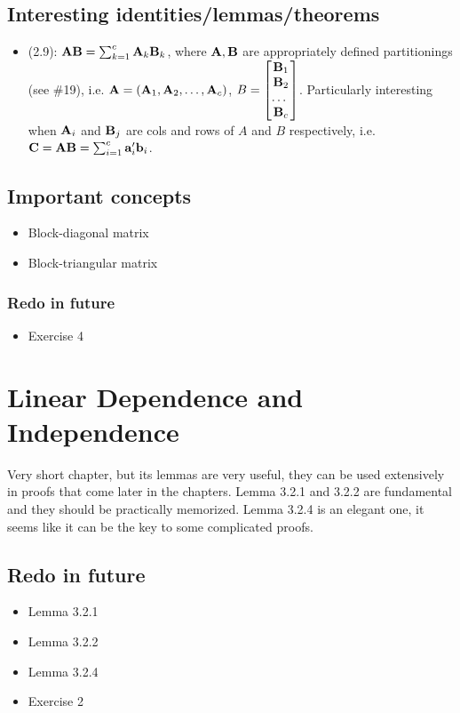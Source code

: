 \documentclass[a4paper, oneside]{book}
\begin{document}
\section*{Interesting identities/lemmas/theorems}
\begin{itemize}
\item (2.9): $\mathbf{AB} = \sum_{k=1}^c \mathbf{A}_k \mathbf{B}_k$, where $\mathbf{A,B}$ are appropriately defined partitionings (see \#19), i.e. $\mathbf{A} = \left(\mathbf{A}_1, \mathbf{A}_2, \hdots, \mathbf{A}_c \right)$, $B=\begin{bmatrix} \mathbf{B}_1\\ \mathbf{B}_2\\ \hdots\ \\ \mathbf{B}_c \end{bmatrix}$. Particularly interesting when $\mathbf{A}_i$ and $\mathbf{B}_j$ are cols and rows of $A$ and $B$ respectively, i.e. $\mathbf{C}=\mathbf{A}\mathbf{B}=\sum_{i=1}^c \mathbf{a}'_i\mathbf{b}_i$.
\end{itemize}

\section*{Important concepts}
\begin{itemize}
\item Block-diagonal matrix
\item Block-triangular matrix
\end{itemize}

\subsection{Redo in future}
\begin{itemize}
\item Exercise 4
\end{itemize}

\chapter{Linear Dependence and Independence}
Very short chapter, but its lemmas are very useful, they can be used extensively in proofs that come later in the chapters. Lemma 3.2.1 and 3.2.2 are fundamental and they should be practically memorized. Lemma 3.2.4 is an elegant one, it seems like it can be the key to some complicated proofs. 

\section{Redo in future}
\begin{itemize}
\item Lemma 3.2.1
\item Lemma 3.2.2
\item Lemma 3.2.4
\item Exercise 2
\end{itemize}
\end{document}
